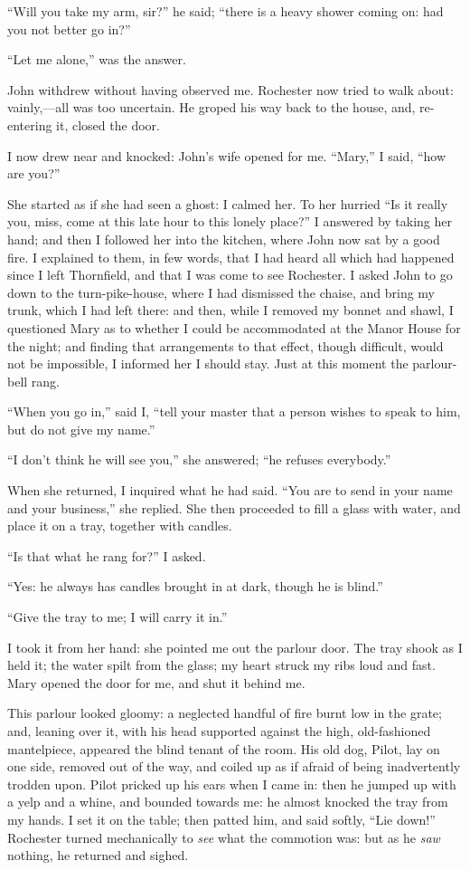 \enquote{Will you take my arm, sir?} he said; \enquote{there is a heavy
shower coming on: had you not better go in?}

\enquote{Let me alone,} was the answer.

John withdrew without having observed me. \Mr{} Rochester now tried to
walk about: vainly,---all was too uncertain. He groped his way back to
the house, and, re-entering it, closed the door.

I now drew near and knocked: John's wife opened for me. \enquote{Mary,}
I said, \enquote{how are you?}

She started as if she had seen a ghost: I calmed her. To her hurried
\enquote{Is it really you, miss, come at this late hour to this lonely
place?} I answered by taking her hand; and then I followed her into the
kitchen, where John now sat by a good fire. I explained to them, in few
words, that I had heard all which had happened since I left Thornfield,
and that I was come to see \Mr{} Rochester. I asked John to go down to
the turn-pike-house, where I had dismissed the chaise, and bring my
trunk, which I had left there: and then, while I removed my bonnet and
shawl, I questioned Mary as to whether I could be accommodated at the
Manor House for the night; and finding that arrangements to that effect,
though difficult, would not be impossible, I informed her I should
stay. Just at this moment the parlour-bell rang.

\enquote{When you go in,} said I, \enquote{tell your master that a
person wishes to speak to him, but do not give my name.}

\enquote{I don't think he will see you,} she answered; \enquote{he
refuses everybody.}

When she returned, I inquired what he had said. \enquote{You are to
send in your name and your business,} she replied. She then proceeded
to fill a glass with water, and place it on a tray, together with
candles.

\enquote{Is that what he rang for?} I asked.

\enquote{Yes: he always has candles brought in at dark, though he is
blind.}

\enquote{Give the tray to me; I will carry it in.}

I took it from her hand: she pointed me out the parlour door. The tray
shook as I held it; the water spilt from the glass; my heart struck my
ribs loud and fast. Mary opened the door for me, and shut it behind me.

This parlour looked gloomy: a neglected handful of fire burnt low in the
grate; and, leaning over it, with his head supported against the high,
old-fashioned mantelpiece, appeared the blind tenant of the room. His
old dog, Pilot, lay on one side, removed out of the way, and coiled up
as if afraid of being inadvertently trodden upon. Pilot pricked up his
ears when I came in: then he jumped up with a yelp and a whine, and
bounded towards me: he almost knocked the tray from my hands. I set it
on the table; then patted him, and said softly, \enquote{Lie down!} \Mr{}
 Rochester turned mechanically to \emph{see} what the commotion was: but
as he \emph{saw} nothing, he returned and sighed.

